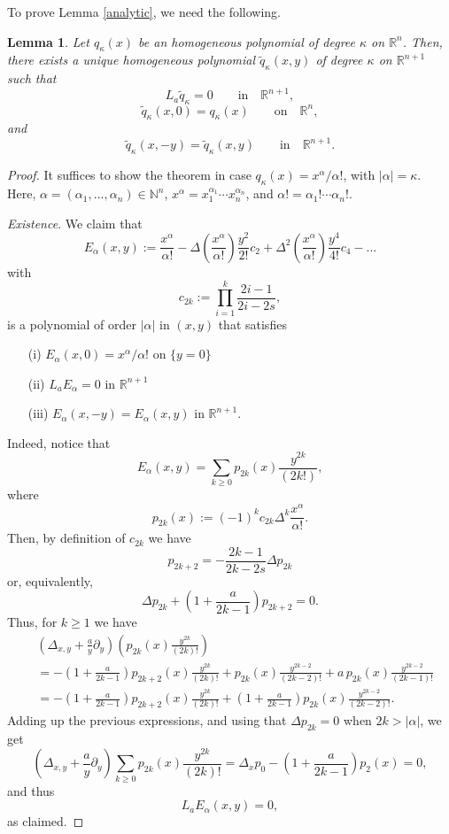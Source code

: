\documentclass[11pt]{amsart}
\theoremstyle{plain}
\newtheorem{lemma}[thrm]{Lemma}
\numberwithin{equation}{section}
\begin{document}
To prove Lemma \ref{analytic}, we need the following.

\begin{lemma}\label{polynomials}
Let $q_\kappa(x)$ be an homogeneous polynomial of degree $\kappa$ on ${\mathbb R}^n$.
Then, there exists a unique homogeneous polynomial $\tilde q_\kappa(x,y)$ of degree $\kappa$ on ${\mathbb R}^{n+1}$ such that
\[L_a \tilde q_\kappa=0\qquad \textrm{in}\quad {\mathbb R}^{n+1},\]
\[\tilde q_\kappa(x,0)=q_\kappa(x)\qquad \textrm{on}\quad {\mathbb R}^n,\]
and
\[\tilde q_\kappa(x,-y)=\tilde q_\kappa(x,y)\qquad \textrm{in}\quad {\mathbb R}^{n+1}.\]
\end{lemma}

\begin{proof}
It suffices to show the theorem in case $q_\kappa(x)=x^\alpha/\alpha!$, with $|\alpha|=\kappa$.
Here, $\alpha=(\alpha_1,...,\alpha_n)\in \mathbb N^n$, $x^\alpha=x_1^{\alpha_1}\cdots x_n^{\alpha_n}$, and $\alpha!=\alpha_1!\cdots \alpha_n!$.

\emph{Existence}. We claim that
\[E_\alpha(x,y):=\frac{x^\alpha}{\alpha!}-\Delta\left(\frac{x^\alpha}{\alpha!}\right)\frac{y^2}{2!}c_2+ \Delta^2\left(\frac{x^\alpha}{\alpha!}\right)\frac{y^4}{4!}c_4-...\]
with
\[c_{2k}:=\prod_{i=1}^k \frac{2i-1}{2i-2s},\]
is a polynomial of order $|\alpha|$ in $(x,y)$ that satisfies
\begin{itemize}
\item[(i)] $E_\alpha(x,0)=x^\alpha/\alpha!$ on $\{y=0\}$
\item[(ii)] $L_aE_\alpha=0$ in ${\mathbb R}^{n+1}$
\item[(iii)] $E_\alpha(x,-y)=E_\alpha(x,y)$ in ${\mathbb R}^{n+1}$.
\end{itemize}
Indeed, notice that
\[E_\alpha(x,y)=\sum_{k\geq0}p_{2k}(x)\frac{y^{2k}}{(2k!)},\]
where
\[p_{2k}(x):=(-1)^k c_{2k}\Delta^k\frac{x^\alpha}{\alpha!}.\]
Then, by definition of $c_{2k}$ we have
\[p_{2k+2}=-\frac{2k-1}{2k-2s}\Delta p_{2k}\]
or, equivalently,
\[\Delta p_{2k}+\left(1+\frac{a}{2k-1}\right)p_{2k+2}=0.\]
Thus, for $k\geq1$ we have
\[\begin{split}&\left(\Delta_{x,y}+\frac{a}{y}\partial_y\right)\left(p_{2k}(x)\frac{y^{2k}}{(2k)!}\right) \\
&=-\left(1+\frac{a}{2k-1}\right) p_{2k+2}(x)\frac{y^{2k}}{(2k)!}+ p_{2k}(x)\frac{y^{2k-2}}{(2k-2)!}+ a\,p_{2k}(x)\frac{y^{2k-2}}{(2k-1)!}\\
&=-\left(1+\frac{a}{2k-1}\right)p_{2k+2}(x)\frac{y^{2k}}{(2k)!} +\left(1+\frac{a}{2k-1}\right)p_{2k}(x)\frac{y^{2k-2}}{(2k-2)!}.
\end{split}\]
Adding up the previous expressions, and using that $\Delta p_{2k}=0$ when $2k>|\alpha|$, we get
\[\left(\Delta_{x,y}+\frac{a}{y}\partial_y\right)\sum_{k\geq0}p_{2k}(x)\frac{y^{2k}}{(2k)!}=\Delta_x p_0-\left(1+\frac{a}{2k-1}\right)p_2(x)=0,\]
and thus
\[L_a E_\alpha(x,y)=0,\]
as claimed.


\end{proof}
\end{document}

